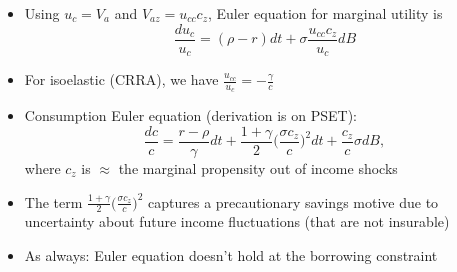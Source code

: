 \documentclass[10pt]{beamer}
\begin{document}
\begin{frame}{}
\begin{itemize}
\item Using $u_c = V_a$ and $V_{az} = u_{cc} c_z$, Euler equation for marginal utility is
\begin{equation*}
	\frac{du_c}{u_c} = (\rho - r) dt + \sigma \frac{u_{cc} c_z}{u_c} dB
\end{equation*}

\item For isoelastic (CRRA), we have $\frac{u_{cc}}{u_c} = - \frac{\gamma}{c}$

\item Consumption Euler equation (derivation is on PSET):
\begin{equation*}
	\frac{dc}{c} = \frac{r - \rho}{\gamma} dt + \frac{1+\gamma}{2} \bigg( \frac{\sigma c_z}{c} \bigg)^2 dt + \frac{c_z}{c} \sigma dB,
\end{equation*}
where $c_z$ is $\approx$ the marginal propensity out of income shocks

\item The term $ \frac{1+\gamma}{2} \big( \frac{\sigma c_z}{c} \big)^2$ captures a precautionary savings motive due to uncertainty about future income fluctuations (that are not insurable)

\item As always: Euler equation doesn't hold at the borrowing constraint
\end{itemize}
\end{frame}










\appendix
\end{document}
